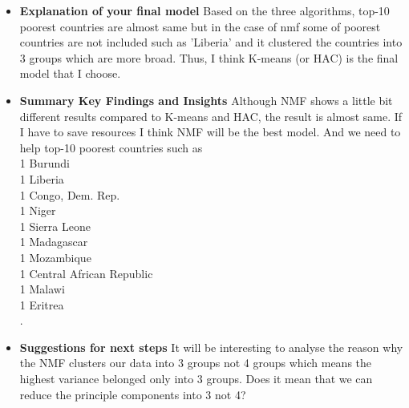 \documentclass[12pt]{article}
\begin{document}
\begin{itemize}
\begin{enumerate}
    \end{enumerate}

\item \textbf{Explanation of your final model}
Based on the three algorithms, top-10 poorest countries are almost same but in the case of nmf some of poorest countries are not included such as 'Liberia' and it clustered the countries into 3 groups which are more broad. Thus, I think K-means (or HAC) is the final model that I choose.

\item \textbf{Summary Key Findings and Insights}
Although NMF shows a little bit different results compared to K-means and HAC, the result is almost same. If I have to save resources I think NMF will be the best model. And we need to help top-10 poorest countries such as \\
1                     Burundi\\
1                     Liberia\\
1            Congo, Dem. Rep.\\
1                       Niger\\
1                Sierra Leone\\
1                  Madagascar\\
1                  Mozambique\\
1    Central African Republic\\
1                      Malawi\\
1                     Eritrea\\
.

\item \textbf{Suggestions for next steps}
It will be interesting to analyse the reason why the NMF clusters our data into 3 groups not 4 groups which means the highest variance belonged only into 3 groups. Does it mean that we can reduce the principle components into 3 not 4?

\end{itemize}
\end{document}

